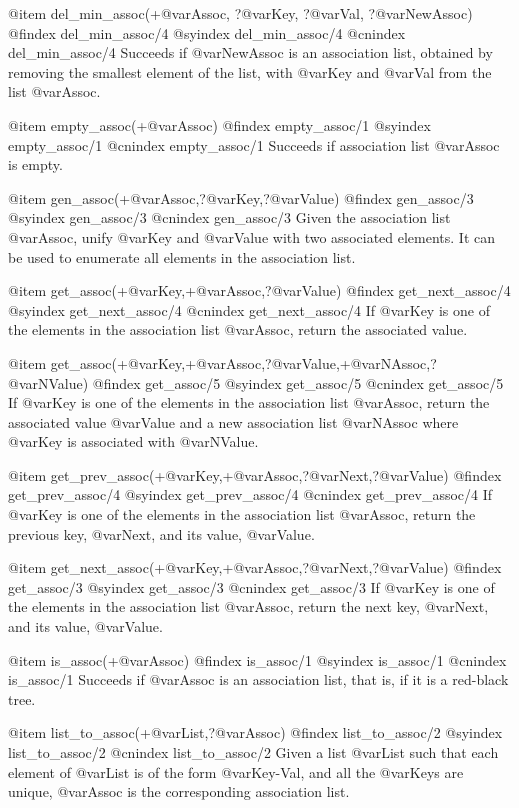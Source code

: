 {{{{{{{{{@item del_min_assoc(+@var{Assoc}, ?@var{Key}, ?@var{Val}, ?@var{NewAssoc})
@findex del_min_assoc/4
@syindex del_min_assoc/4
@cnindex del_min_assoc/4
Succeeds if @var{NewAssoc} is an association list, obtained by removing
the smallest element of the list, with @var{Key} and @var{Val}
from the list @var{Assoc}.

@item empty_assoc(+@var{Assoc})
@findex empty_assoc/1
@syindex empty_assoc/1
@cnindex empty_assoc/1
Succeeds if association list @var{Assoc} is empty.

@item gen_assoc(+@var{Assoc},?@var{Key},?@var{Value})
@findex gen_assoc/3
@syindex gen_assoc/3
@cnindex gen_assoc/3
Given the association list @var{Assoc}, unify @var{Key} and @var{Value}
with two associated elements. It can be used to enumerate all elements
in the association list.

@item get_assoc(+@var{Key},+@var{Assoc},?@var{Value})
@findex get_next_assoc/4
@syindex get_next_assoc/4
@cnindex get_next_assoc/4
If @var{Key} is one of the elements in the association list @var{Assoc},
return the associated value.

@item get_assoc(+@var{Key},+@var{Assoc},?@var{Value},+@var{NAssoc},?@var{NValue})
@findex get_assoc/5
@syindex get_assoc/5
@cnindex get_assoc/5
If @var{Key} is one of the elements in the association list @var{Assoc},
return the associated value @var{Value} and a new association list
@var{NAssoc} where @var{Key} is associated with @var{NValue}.

@item get_prev_assoc(+@var{Key},+@var{Assoc},?@var{Next},?@var{Value})
@findex get_prev_assoc/4
@syindex get_prev_assoc/4
@cnindex get_prev_assoc/4
If @var{Key} is one of the elements in the association list @var{Assoc},
return the previous key, @var{Next}, and its value, @var{Value}.

@item get_next_assoc(+@var{Key},+@var{Assoc},?@var{Next},?@var{Value})
@findex get_assoc/3
@syindex get_assoc/3
@cnindex get_assoc/3
If @var{Key} is one of the elements in the association list @var{Assoc},
return the next key, @var{Next}, and its value, @var{Value}.

@item is_assoc(+@var{Assoc})
@findex is_assoc/1
@syindex is_assoc/1
@cnindex is_assoc/1
Succeeds if @var{Assoc} is an association list, that is, if it is a
red-black tree.

@item list_to_assoc(+@var{List},?@var{Assoc})
@findex list_to_assoc/2
@syindex list_to_assoc/2
@cnindex list_to_assoc/2
Given a list @var{List} such that each element of @var{List} is of the
form @var{Key-Val}, and all the @var{Keys} are unique, @var{Assoc} is
the corresponding association list.

}}}}}}}}}
